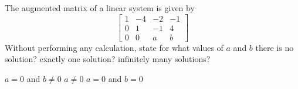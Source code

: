 
\begin{Exercise}[name={},
title={}, 
origin={\cite{MB}},
counter=Exercise]
The augmented matrix of a linear system is given by
\[
\begin{bmatrix}
1 & -4 & -2 & -1 \\ 
0 & 1 & -1 & 4 \\ 
0 & 0& a & b 
\end{bmatrix}
\]
Without performing any calculation, state for what values of $a$ and $b$ there is
\Question no solution?
\Question exactly one solution?
\Question infinitely many solutions?
\end{Exercise}

\begin{Answer}
\Question $a=0$ and $b\neq0$
\Question $a\neq0$
\Question $a=0$ and $b=0$
\end{Answer}


